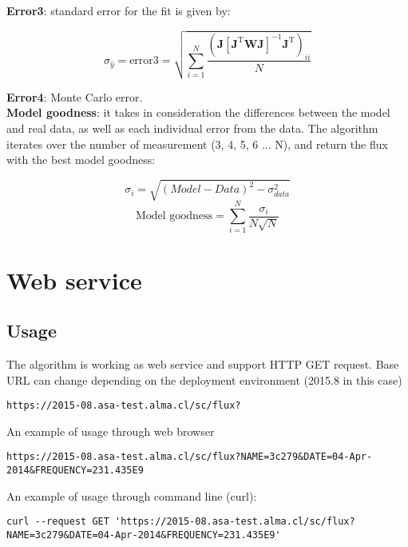 \documentclass[10pt]{article}
\begin{document}
\noindent \textbf{Error3}: standard error for the fit is given by:

$$ \sigma_{\hat{y}} = \text{error3} = \sqrt{\sum_{i=1}^{N}\frac{(\mathbf{J}[\mathbf{J}^{\text{T}}\mathbf{W}\mathbf{J}]^{-1}\mathbf{J}^{\text{T}})_{ii}}{N}} $$

\noindent \textbf{Error4}: Monte Carlo error. \\

\noindent \textbf{Model goodness}: it takes in consideration the differences
between the model and real data, as well as each individual error from the
data. The algorithm iterates over the number of measurement (3, 4, 5, 6 ... N),
and return the flux with the best model goodness:

$$ \sigma_i = \sqrt{ (Model - Data)^2 - \sigma_{data}^2 } $$
$$ \text{Model goodness} = \sum_{i=1}^{N}\frac{\sigma_i}{N\sqrt{N}} $$

\section{Web service}
\subsection{Usage}
The algorithm is working as web service and support HTTP GET request. Base URL can change depending on the deployment environment (2015.8 in this case)

\begingroup
\fontsize{8pt}{10pt}\selectfont
\begin{verbatim}
https://2015-08.asa-test.alma.cl/sc/flux?
\end{verbatim}
\endgroup

\noindent An example of usage through web browser
\begingroup
\fontsize{6pt}{10pt}\selectfont
\begin{verbatim}
https://2015-08.asa-test.alma.cl/sc/flux?NAME=3c279&DATE=04-Apr-2014&FREQUENCY=231.435E9
\end{verbatim}
\endgroup

\noindent An example of usage through command line (curl):
\begingroup
\fontsize{6pt}{10pt}\selectfont
\begin{verbatim}
curl --request GET 'https://2015-08.asa-test.alma.cl/sc/flux?NAME=3c279&DATE=04-Apr-2014&FREQUENCY=231.435E9'
\end{verbatim}
\endgroup
\end{document}
